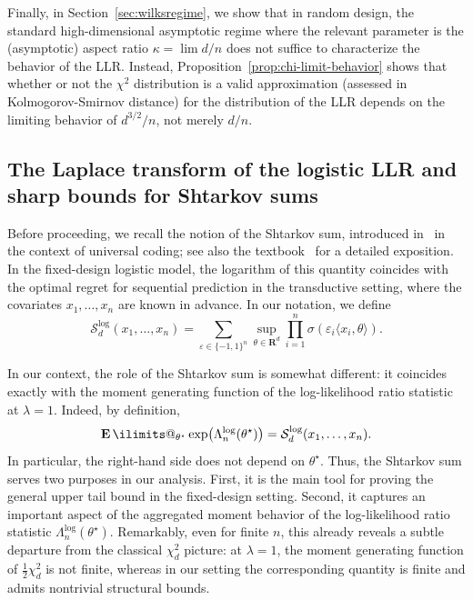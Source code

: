 \documentclass[11pt, letterpaper, hidelinks]{article}
\makeatletter
\newcommand{\R}{\mathbf R}
\newcommand{\1}{\mathbf 1}
\newcommand{\E}{\operatorname*{\mathbf{E}}\ilimits@}
\theoremstyle{plain}
\theoremstyle{definition}
\newcommand{\thetastar}{\theta^\star}
\newcommand{\defn}{=}
\makeatother
\begin{document}
Finally, in Section~\ref{sec:wilksregime}, we show that in random design, the standard high-dimensional asymptotic regime where the relevant parameter is the (asymptotic) aspect ratio $\kappa = \lim d/n$ does not suffice to characterize the behavior of the LLR. Instead, Proposition~\ref{prop:chi-limit-behavior} shows that whether or not the $\chi^2$ distribution is a valid approximation (assessed in Kolmogorov-Smirnov distance) for the distribution of the LLR depends on the limiting behavior of $d^{3/2}/n$, not merely $d/n$. 



\subsection{The Laplace transform of the logistic LLR and sharp bounds for Shtarkov sums}
\label{sec:shtarkov}
Before proceeding, we recall the notion of the Shtarkov sum, introduced in~\cite{Shtarkov1987} in the context of universal coding; see also the textbook~\cite{CesaBianchiLugosi2006} for a detailed exposition. In the fixed-design logistic model, the logarithm of this quantity coincides with the optimal regret for sequential prediction in the {transductive} setting, where the covariates \(x_1,\dots,x_n\) are known in advance. In our notation, we define
\begin{equation}
\label{eq:shtarkovsum}
\mathcal{S}_d^{\operatorname{log}}(x_1,\dots,x_n)
\defn
\sum_{\varepsilon \in \{-1,1\}^n}
\sup_{\theta \in \R^d}
\prod_{i=1}^n \sigma(\varepsilon_i\langle x_i,\theta\rangle).
\end{equation}

In our context, the role of the Shtarkov sum is somewhat different: it coincides exactly with the moment generating function of the log-likelihood ratio statistic at \(\lambda = 1\). Indeed, by definition,
\[
\E_{\thetastar}\exp\bigl(\Lambda_n^{\operatorname{log}}(\thetastar)\bigr)
=
\mathcal{S}_d^{\operatorname{log}}(x_1,\dots,x_n).
\]
In particular, the right-hand side does not depend on \(\thetastar\). Thus, the Shtarkov sum serves two purposes in our analysis. First, it is the main tool for proving the general upper tail bound in the fixed-design setting. Second, it captures an important aspect of the aggregated moment behavior of the log-likelihood ratio statistic \(\Lambda_n^{\operatorname{log}}(\thetastar)\). Remarkably, even for finite \(n\), this already reveals a subtle departure from the classical \(\chi_d^2\) picture: at \(\lambda = 1\), the moment generating function of \(\frac12 \chi_d^2\) is not finite, whereas in our setting the corresponding quantity is finite and admits nontrivial structural bounds.
\end{document}

